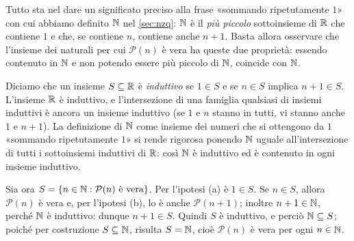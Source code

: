 \begin{schema}
\end{schema}

\begin{strategia}
Tutto sta nel dare un significato preciso alla frase «sommando ripetutamente $1$» con
cui abbiamo definito $\mathbb{N}$ nel \cref{sec:nzq}: $\mathbb{N}$ è il \emph{più piccolo}
sottoinsieme di $\mathbb{R}$ che contiene $1$ e che, se contiene $n$, contiene anche $n+1$.
Basta allora osservare che l'insieme dei naturali per cui $\mathcal{P}(n)$ è vera ha
queste due proprietà: essendo contenuto in $\mathbb{N}$ e non potendo essere più piccolo di
$\mathbb{N}$, coincide con $\mathbb{N}$.
\end{strategia}

\begin{dimostrazione}
Diciamo che un insieme $S\subseteq\mathbb{R}$ è \emph{induttivo} se $1\in S$ e se $n\in S$
implica $n+1\in S$. L'insieme $\mathbb{R}$ è induttivo, e l'intersezione di una famiglia
qualsiasi di insiemi induttivi è ancora un insieme induttivo (se $1$ e $n$ stanno in
tutti, vi stanno anche $1$ e $n+1$). La definizione di $\mathbb{N}$ come insieme dei numeri che
si ottengono da $1$ «sommando ripetutamente $1$» si rende rigorosa ponendo $\mathbb{N}$ uguale
all'intersezione di tutti i sottoinsiemi induttivi di $\mathbb{R}$: così $\mathbb{N}$ è induttivo ed è
contenuto in ogni insieme induttivo.

Sia ora $S=\{n\in\mathbb{N} : \mathcal{P}(n)\text{ è vera}\}$. Per l'ipotesi (a) è $1\in S$.
Se $n\in S$, allora $\mathcal{P}(n)$ è vera e, per l'ipotesi (b), lo è anche
$\mathcal{P}(n+1)$; inoltre $n+1\in\mathbb{N}$, perché $\mathbb{N}$ è induttivo: dunque $n+1\in S$.
Quindi $S$ è induttivo, e perciò $\mathbb{N}\subseteq S$; poiché per costruzione
$S\subseteq\mathbb{N}$, risulta $S=\mathbb{N}$, cioè $\mathcal{P}(n)$ è vera per ogni $n\in\mathbb{N}$.
\end{dimostrazione}

